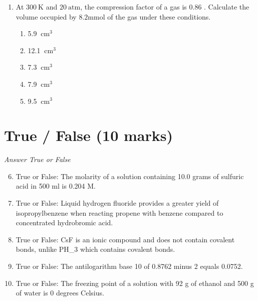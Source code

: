\documentclass[12pt]{article}
\begin{document}
\begin{enumerate}[label=\arabic*.]
\begin{enumerate}[label=(\alph*)]
    \item IR radiation can ionize organic molecules, providing structural information
    \item absorption of IR radiation increases with molecular complexity
    \item all molecular bonds absorb IR radiation
    \item IR spectroscopy can identify isotopes within organic molecules
    \item most organic functional groups absorb in a characteristic region of the IR spectrum
\end{enumerate}
\item At $300 \mathrm{~K}$ and $20 \mathrm{~atm}$, the compression factor of a gas is 0.86 . Calculate the volume occupied by $8.2 \mathrm{mmol}$ of the gas under these conditions.
\begin{enumerate}[label=(\alph*)]
    \item 5.9 $\mathrm{~cm}^3$
    \item 12.1 $\mathrm{~cm}^3$
    \item 7.3 $\mathrm{~cm}^3$
    \item 7.9 $\mathrm{~cm}^3$
    \item 9.5 $\mathrm{~cm}^3$
\end{enumerate}
\end{enumerate}

\section*{True / False (10 marks)}
\textit{Answer True or False}
\begin{enumerate}[label=\arabic*.]
\setcounter{enumi}{5}
\item True or False: The molarity of a solution containing 10.0 grams of sulfuric acid in 500 ml is 0.204 M.
\item True or False: Liquid hydrogen fluoride provides a greater yield of isopropylbenzene when reacting propene with benzene compared to concentrated hydrobromic acid.
\item True or False: CsF is an ionic compound and does not contain covalent bonds, unlike PH\_3 which contains covalent bonds.
\item True or False: The antilogarithm base 10 of 0.8762 minus 2 equals 0.0752.
\item True or False: The freezing point of a solution with 92 g of ethanol and 500 g of water is 0 degrees Celsius.
\end{enumerate}
\end{document}
